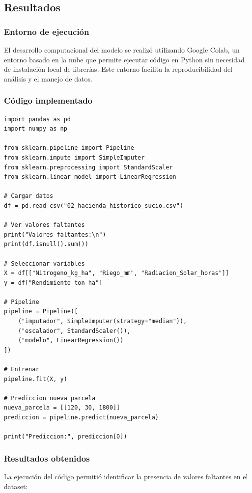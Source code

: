 \subsection{Resultados}

\subsubsection{Entorno de ejecución}

El desarrollo computacional del modelo se realizó utilizando Google Colab, un entorno basado en la nube que permite ejecutar código en Python sin necesidad de instalación local de librerías. Este entorno facilita la reproducibilidad del análisis y el manejo de datos.

\subsubsection{Código implementado}

\begin{lstlisting}
import pandas as pd
import numpy as np

from sklearn.pipeline import Pipeline
from sklearn.impute import SimpleImputer
from sklearn.preprocessing import StandardScaler
from sklearn.linear_model import LinearRegression

# Cargar datos
df = pd.read_csv("02_hacienda_historico_sucio.csv")

# Ver valores faltantes
print("Valores faltantes:\n")
print(df.isnull().sum())

# Seleccionar variables
X = df[["Nitrogeno_kg_ha", "Riego_mm", "Radiacion_Solar_horas"]]
y = df["Rendimiento_ton_ha"]

# Pipeline
pipeline = Pipeline([
    ("imputador", SimpleImputer(strategy="median")),
    ("escalador", StandardScaler()),
    ("modelo", LinearRegression())
])

# Entrenar
pipeline.fit(X, y)

# Prediccion nueva parcela
nueva_parcela = [[120, 30, 1800]]
prediccion = pipeline.predict(nueva_parcela)

print("Prediccion:", prediccion[0])
\end{lstlisting}

\subsubsection{Resultados obtenidos}

La ejecución del código permitió identificar la presencia de valores faltantes en el dataset:

